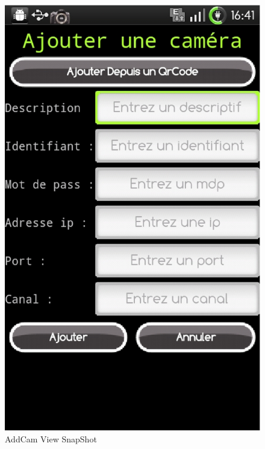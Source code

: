  \begin{center}
 \begin{figure}[H] 
  \label{addCamScreenShot}
  \centering
  \includegraphics[scale=0.3]{Images/addCamScreenShot.eps}
  \caption{AddCam View SnapShot}
\end{figure}  
\end{center}


